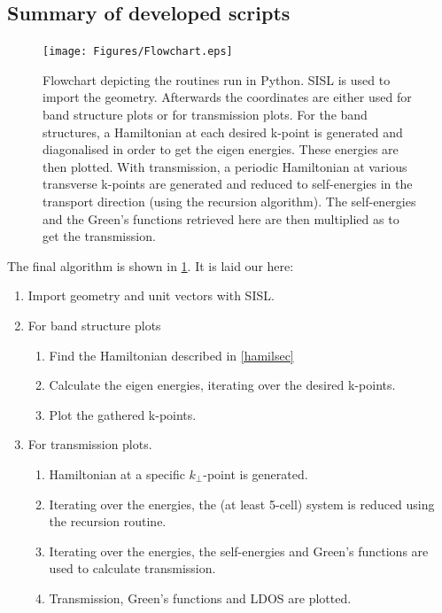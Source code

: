 \subsection{Summary of developed scripts}
\begin{figure}[ht]
	\centering
	\texttt{[image: Figures/Flowchart.eps]}
	\caption{Flowchart depicting the routines run in Python. SISL is used to import the geometry. Afterwards the coordinates are either used for band structure plots or for transmission plots. For the band structures, a Hamiltonian at each desired k-point is generated and diagonalised in order to get the eigen energies. These energies are then plotted. With transmission, a periodic Hamiltonian at various transverse k-points are generated and reduced to self-energies in the transport direction (using the recursion algorithm). The self-energies and the Green's functions retrieved here are then multiplied as to get the transmission.}
	\label{Flowchart}
\end{figure}
The final algorithm is shown in \cref{Flowchart}. It is laid our here:
\begin{enumerate}
	\item Import geometry and unit vectors with SISL.
	\item For band structure plots
	      \begin{enumerate}
		      \item Find the Hamiltonian described in \cref{hamilsec}
		      \item Calculate the eigen energies, iterating over the desired k-points.
		      \item Plot the gathered k-points.
	      \end{enumerate}
	\item For transmission plots.
	      \begin{enumerate}
		      \item Hamiltonian at a specific \(k_{\perp}\)-point is generated.
		      \item Iterating over the energies, the (at least 5-cell) system is reduced using the recursion routine.
		      \item Iterating over the energies, the self-energies and Green's functions are used to calculate transmission.
		      \item Transmission, Green's functions and LDOS are plotted.
	      \end{enumerate}
\end{enumerate}
